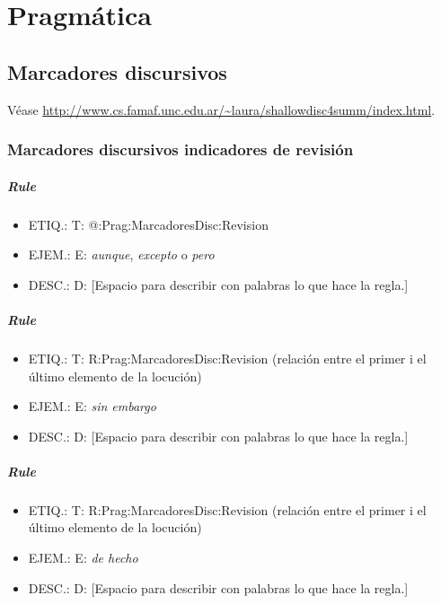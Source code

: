 \documentclass[11pt]{report}
\begin{document}
\chapter{Pragmática}
\section{Marcadores discursivos}
Véase \url{http://www.cs.famaf.unc.edu.ar/~laura/shallowdisc4summ/index.html}.

\subsection{Marcadores discursivos indicadores de revisión}
\paragraph*{Rule}
\begin{itemize}
\item ETIQ.:  T: @:Prag:MarcadoresDisc:Revision
\item EJEM.:  E: \emph{aunque}, \emph{excepto} o \emph{pero}
\item DESC.:  D: [Espacio para describir con palabras lo que hace la regla.]
\end{itemize}

\paragraph*{Rule}
\begin{itemize}
\item ETIQ.:  T: R:Prag:MarcadoresDisc:Revision (relación entre el primer i el último elemento de la locución)
\item EJEM.:  E: \emph{sin embargo}
\item DESC.:  D: [Espacio para describir con palabras lo que hace la regla.]
\end{itemize}

\paragraph*{Rule}
\begin{itemize}
\item ETIQ.:  T: R:Prag:MarcadoresDisc:Revision (relación entre el primer i el último elemento de la locución)
\item EJEM.:  E: \emph{de hecho}
\item DESC.:  D: [Espacio para describir con palabras lo que hace la regla.]
\end{itemize}
\end{document}
